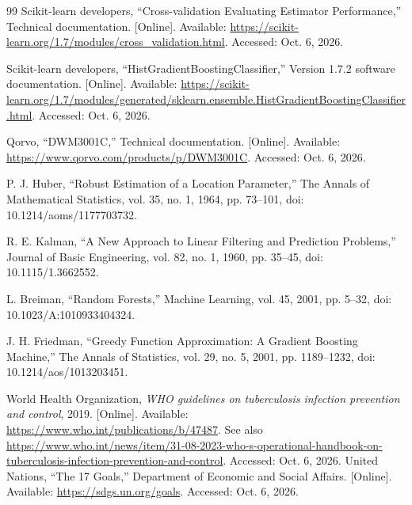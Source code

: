 \documentclass[12pt,a4paper]{report}
\begin{document}
\begin{thebibliography}{99}
 Scikit-learn developers, ``Cross-validation Evaluating Estimator Performance,'' Technical documentation. [Online]. Available: \url{https://scikit-learn.org/1.7/modules/cross_validation.html}. Accessed: Oct. 6, 2026.

 Scikit-learn developers, ``HistGradientBoostingClassifier,'' Version 1.7.2 software documentation. [Online]. Available: \url{https://scikit-learn.org/1.7/modules/generated/sklearn.ensemble.HistGradientBoostingClassifier.html}. Accessed: Oct. 6, 2026.

 Qorvo, ``DWM3001C,'' Technical documentation. [Online]. Available: \url{https://www.qorvo.com/products/p/DWM3001C}. Accessed: Oct. 6, 2026.

 P. J. Huber, ``Robust Estimation of a Location Parameter,'' The Annals of Mathematical Statistics, vol. 35, no. 1, 1964, pp. 73--101, doi: 10.1214/aoms/1177703732.

 R. E. Kalman, ``A New Approach to Linear Filtering and Prediction Problems,'' Journal of Basic Engineering, vol. 82, no. 1, 1960, pp. 35--45, doi: 10.1115/1.3662552.

 L. Breiman, ``Random Forests,'' Machine Learning, vol. 45, 2001, pp. 5--32, doi: 10.1023/A:1010933404324.

 J. H. Friedman, ``Greedy Function Approximation: A Gradient Boosting Machine,'' The Annals of Statistics, vol. 29, no. 5, 2001, pp. 1189--1232, doi: 10.1214/aos/1013203451.

 World Health Organization, \textit{WHO guidelines on tuberculosis infection prevention and control}, 2019. [Online]. Available: \url{https://www.who.int/publications/b/47487}. See also \url{https://www.who.int/news/item/31-08-2023-who-s-operational-handbook-on-tuberculosis-infection-prevention-and-control}. Accessed: Oct. 6, 2026.
 United Nations, ``The 17 Goals,'' Department of Economic and Social Affairs. [Online]. Available: \url{https://sdgs.un.org/goals}. Accessed: Oct. 6, 2026.
\end{thebibliography}
\end{document}
